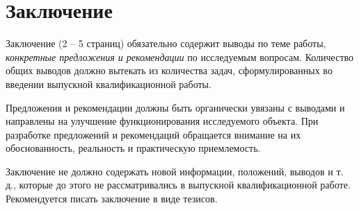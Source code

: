 \chapter*{Заключение} \label{ch-conclusion}

Заключение (2 -- 5 страниц) обязательно содержит выводы по теме работы, \textit{конкретные
предложения и рекомендации} по исследуемым вопросам. Количество общих выводов
должно вытекать из количества задач, сформулированных во введении выпускной
квалификационной работы.

Предложения и рекомендации должны быть органически увязаны с выводами
и направлены на улучшение функционирования исследуемого объекта. При разработке
предложений и рекомендаций обращается внимание на их обоснованность,
реальность и практическую приемлемость.

Заключение не должно содержать новой информации, положений, выводов и
т. д., которые до этого не рассматривались в выпускной квалификационной работе.
Рекомендуется писать заключение в виде тезисов.